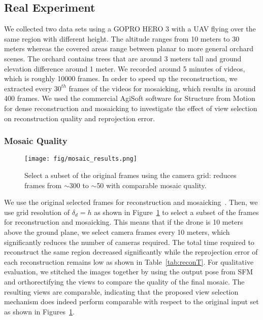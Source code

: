 \subsection{Real Experiment}
We collected two data sets using a GOPRO HERO 3 with a UAV flying over the same region with different height. The altitude ranges from 10 meters to 30 meters whereas the covered areas range between planar to more general orchard scenes. The orchard contains trees that are around 3 meters tall and ground elevation difference around 1 meter. We recorded around 5 minutes of videos, which is roughly 10000 frames. In order to speed up the reconstruction, we extracted every $30^{th}$ frames of the videos for mosaicking, which results in around 400 frames.
We used the commercial AgiSoft software for Structure from Motion for dense reconstruction and mosaicking to investigate the effect of view selection on reconstruction quality and reprojection error.

\subsubsection{Mosaic Quality}
\begin{figure}
\centering
	\texttt{[image: fig/mosaic\_results.png]}
	\caption{Select a subset of the original frames using the camera grid: reduces frames from $\sim$300 to $\sim$50 with comparable mosaic quality.}
\label{fig:mosaic}
\end{figure} 

We use the original selected frames for reconstruction and mosaicking~\cite{zhengqi}. Then, we use grid resolution of $\delta_d = h$ as shown in Figure~\ref{fig:mosaic} to select a subset of the frames for reconstruction and mosaicking. This means that if the drone is 10 meters above the ground plane, we select camera frames every 10 meters, which significantly reduces the number of cameras required. 
The total time required to reconstruct the same region decreased significantly while the reprojection error of each reconstruction remains low as shown in Table~\ref{tab:reconT}. For qualitative evaluation,  we stitched the images together by using the output pose from SFM and orthorectifying the views to compare the quality of the final mosaic. The resulting views are comparable, indicating that the proposed view selection mechanism does indeed perform comparable with respect to the original input set as shown in Figures~\ref{fig:mosaic}.

